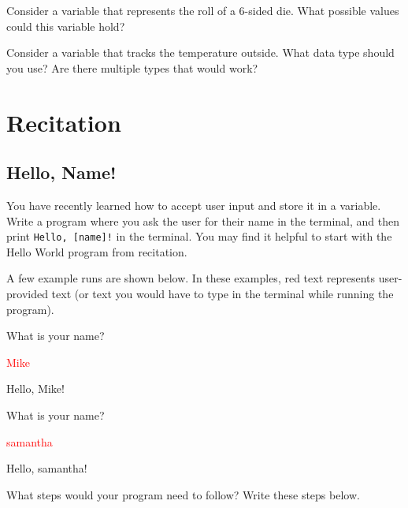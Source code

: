 \begin{problem}
    Consider a variable that represents the roll of a 6-sided die. What possible values could this variable hold? 
\end{problem}

\vspace{1.5cm}

\begin{problem}
    Consider a variable that tracks the temperature outside. What data type should you use? Are there multiple types that would work?
\end{problem}

\vspace{1.5cm}

\section{Recitation}

\subsection{Hello, Name!}
You have recently learned how to accept user input and store it in a variable. Write a program where you ask the user for their name in the terminal, and then print \texttt{Hello, [name]!} in the terminal. You may find it helpful to start with the Hello World program from recitation. 

A few example runs are shown below. In these examples, red text represents user-provided text (or text you would have to type in the terminal while running the program). 

\begin{sample}
What is your name?

\textcolor{red}{Mike}

Hello, Mike!
\end{sample}

\begin{sample}
What is your name?

\textcolor{red}{samantha}

Hello, samantha!
\end{sample}

\begin{multipart}
    What steps would your program need to follow? Write these steps below.
\end{multipart}

\vspace{6cm}

